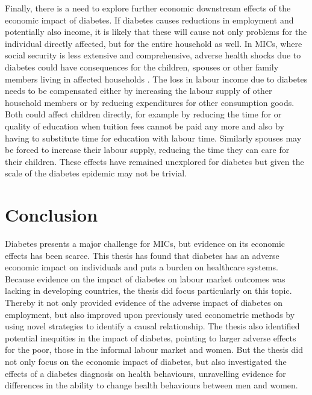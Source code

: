 Finally, there is a need to explore further economic downstream effects of the economic impact of diabetes. If diabetes causes reductions in employment and potentially also income, it is likely that these will cause not only problems for the individual directly affected, but for the entire household as well. In \acp{MIC}, where social security is less extensive and comprehensive, adverse health shocks due to diabetes could have consequences for the children, spouses or other family members living in affected households \parencite{Alam2014}. The loss in labour income due to diabetes needs to be compensated either by increasing the labour supply of other household members or by reducing expenditures for other consumption goods. Both could affect children directly, for example by reducing the time for or quality of education when tuition fees cannot be paid any more and also by having to substitute time for education with labour time. Similarly spouses may be forced to increase their labour supply, reducing the time they can care for their children. These effects have remained unexplored for diabetes but given the scale of the diabetes epidemic may not be trivial.



\section{Conclusion}

Diabetes presents a major challenge for \acp{MIC}, but evidence on its economic effects has been scarce. This thesis has found that diabetes has an adverse economic impact on individuals and puts a burden on healthcare systems. Because evidence on the impact of diabetes on labour market outcomes was lacking in developing countries, the thesis did focus particularly on this topic. Thereby it not only provided evidence of the adverse impact of diabetes on employment, but also improved upon previously used econometric methods by using novel strategies to identify a causal relationship. The thesis also identified potential inequities in the impact of diabetes, pointing to larger adverse effects for the poor, those in the informal labour market and women. But the thesis did not only focus on the economic impact of diabetes, but also investigated the effects of a diabetes diagnosis on health behaviours, unravelling evidence for differences in the ability to change health behaviours between men and women.

